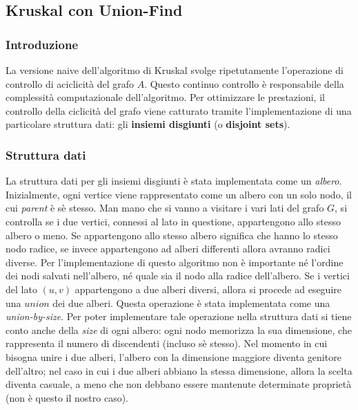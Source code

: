 \subsection{Kruskal con Union-Find}

\subsubsection{Introduzione}

La versione naive dell'algoritmo di Kruskal svolge ripetutamente
l'operazione di controllo di aciclicità del grafo $A$. Questo continuo
controllo è responsabile della complessità computazionale
dell'algoritmo. Per ottimizzare le prestazioni, il controllo della
ciclicità del grafo viene catturato tramite l'implementazione di
una particolare struttura dati: gli \textbf{insiemi disgiunti}
(o \textbf{disjoint sets}).

\subsubsection{Struttura dati}

La struttura dati per gli insiemi disgiunti è stata implementata
come un \textit{albero}. Inizialmente, ogni vertice viene
rappresentato come un albero con un solo nodo, il cui \textit{parent}
è sè stesso. Man mano che si vanno a visitare i vari lati del
grafo $G$, si controlla se i due vertici, connessi al lato in questione,
appartengono allo stesso albero o meno. Se appartengono allo stesso
albero significa che hanno lo stesso nodo radice, se invece appartengono
ad alberi differenti allora avranno radici diverse. Per
l'implementazione di questo algoritmo non è importante né l'ordine dei
nodi salvati nell'albero, né quale sia il nodo alla radice dell'albero.
Se i vertici del lato $(u, v)$ appartengono a due alberi diversi,
allora si procede ad eseguire una $union$ dei due alberi. Questa
operazione è stata implementata come una \textit{union-by-size}.
Per poter implementare tale operazione nella struttura dati si tiene
conto anche della \textit{size} di ogni albero: ogni nodo memorizza
la sua dimensione, che rappresenta il numero di discendenti (incluso
sè stesso). Nel momento in cui bisogna unire i due alberi, l'albero
con la dimensione maggiore diventa genitore dell'altro; nel caso in
cui i due alberi abbiano la stessa dimensione, allora la scelta
diventa casuale, a meno che non debbano essere mantenute determinate
proprietà (non è questo il nostro caso).

